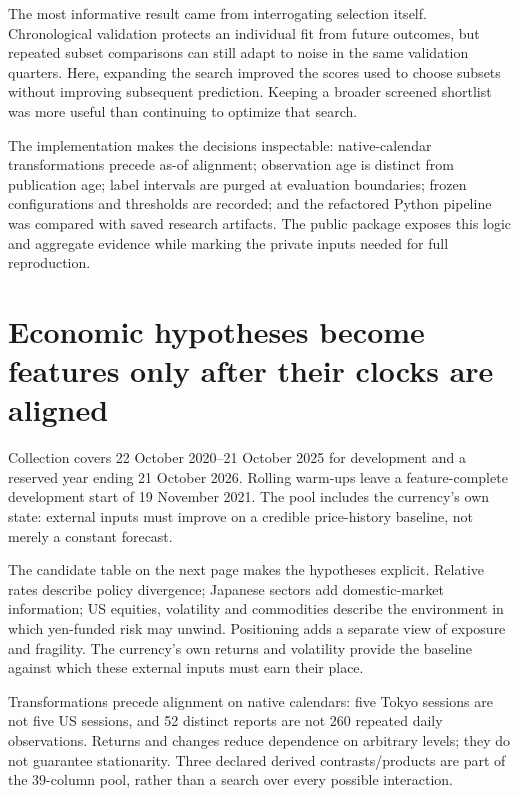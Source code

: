 \documentclass[11pt,a4paper]{article}
\begin{document}
The most informative result came from interrogating selection itself. Chronological validation protects an individual fit from future outcomes, but repeated subset comparisons can still adapt to noise in the same validation quarters. Here, expanding the search improved the scores used to choose subsets without improving subsequent prediction. Keeping a broader screened shortlist was more useful than continuing to optimize that search.

The implementation makes the decisions inspectable: native-calendar transformations precede as-of alignment; observation age is distinct from publication age; label intervals are purged at evaluation boundaries; frozen configurations and thresholds are recorded; and the refactored Python pipeline was compared with saved research artifacts. The public package exposes this logic and aggregate evidence while marking the private inputs needed for full reproduction.

\vfill
{}

\nextpage
\section*{Economic hypotheses become features only after their clocks are aligned}
Collection covers 22 October 2020--21 October 2025 for development and a reserved year ending 21 October 2026. Rolling warm-ups leave a feature-complete development start of 19 November 2021. The pool includes the currency's own state: external inputs must improve on a credible price-history baseline, not merely a constant forecast.

The candidate table on the next page makes the hypotheses explicit. Relative rates describe policy divergence; Japanese sectors add domestic-market information; US equities, volatility and commodities describe the environment in which yen-funded risk may unwind. Positioning adds a separate view of exposure and fragility. The currency's own returns and volatility provide the baseline against which these external inputs must earn their place.

Transformations precede alignment on native calendars: five Tokyo sessions are not five US sessions, and 52 distinct reports are not 260 repeated daily observations. Returns and changes reduce dependence on arbitrary levels; they do not guarantee stationarity. Three declared derived contrasts/products are part of the 39-column pool, rather than a search over every possible interaction.
\end{document}
